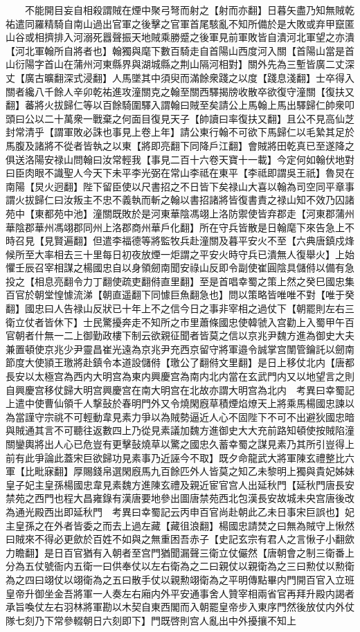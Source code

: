 　　不能開目妄自相殺謂賊在煙中聚弓弩而射之【射而亦翻】日暮矢盡乃知無賊乾祐遣同羅精騎自南山過出官軍之後擊之官軍首尾駭亂不知所備於是大敗或弃甲竄匿山谷或相擠排入河溺死囂聲振天地賊乘勝蹙之後軍見前軍敗皆自潰河北軍望之亦潰【河北軍翰所自將者也】翰獨與麾下數百騎走自首陽山西度河入關【首陽山當是首山衍陽字首山在蒲州河東縣界與湖城縣之荆山隔河相對】關外先為三塹皆廣二丈深丈【廣古曠翻深式浸翻】人馬墜其中須臾而滿餘衆踐之以度【踐息淺翻】士卒得入關者纔八千餘人辛卯乾祐進攻潼關克之翰至關西驛揭牓收散卒欲復守潼關【復扶又翻】蕃將火拔歸仁等以百餘騎圍驛入謂翰曰賊至矣請公上馬翰上馬出驛歸仁帥衆叩頭曰公以二十萬衆一戰棄之何面目復見天子【帥讀曰率復扶又翻】且公不見高仙芝封常清乎【謂軍敗必誅也事見上卷上年】請公東行翰不可欲下馬歸仁以毛縶其足於馬腹及諸將不從者皆執之以東【將即亮翻下同降戶江翻】會賊將田乾真已至遂降之俱送洛陽安禄山問翰曰汝常輕我【事見二百十六卷天寶十一載】今定何如翰伏地對曰臣肉眼不識聖人今天下未平李光弼在常山李祗在東平【李祗即謂吳王祇】魯炅在南陽【炅火迥翻】陛下留臣使以尺書招之不日皆下矣禄山大喜以翰為司空同平章事謂火拔歸仁曰汝叛主不忠不義執而斬之翰以書招諸將皆復書責之禄山知不效乃囚諸苑中【東都苑中池】潼關既敗於是河東華陰馮翊上洛防禦使皆弃郡走【河東郡蒲州華陰郡華州馮翊郡同州上洛郡商州華戶化翻】所在守兵皆散是日翰麾下來告急上不時召見【見賢遍翻】但遣李福德等將監牧兵赴潼關及暮平安火不至【六典唐鎮戍烽候所至大率相去三十里每日初夜放煙一炬謂之平安火時守兵已潰無人復舉火】上始懼壬辰召宰相謀之楊國忠自以身領劒南聞安祿山反即令副使崔圓陰具儲偫以備有急投之【相息亮翻令力丁翻使疏吏翻偫直里翻】至是首唱幸蜀之策上然之癸巳國忠集百官於朝堂惶懅流涕【朝直遥翻下同懅巨魚翻急也】問以策略皆唯唯不對【唯于癸翻】國忠曰人告禄山反狀已十年上不之信今日之事非宰相之過仗下【朝罷則左右三衛立仗者皆休下】士民驚擾奔走不知所之市里蕭條國忠使韓虢入宫勸上入蜀甲午百官朝者什無一二上御勤政樓下制云欲親征聞者皆莫之信以京兆尹魏方進為御史大夫兼置頓使京兆少尹靈昌崔光遠為京兆尹充西京留守將軍邉令誠掌宫闈管鑰託以劒南節度大使頴王璬將赴鎮令本道設儲偫【璬公了翻偫文里翻】是日上移仗北内【唐都長安以太極宫為西内大明宫為東内興慶宫為南内北内當在玄武門内又以地望言之則自興慶宫移仗歸大明宫興慶宫在南大明宫在北故亦謂大明宫為北内　考異曰幸蜀記上遣中使曹仙領千人撃鼔於春明門外又令燒閑廐草積煙焰燎天上將乘馬楊國忠諫以為當謹守宗祧不可輕動韋見素力爭以為賊勢逼近人心不固陛下不可不出避狄國忠暗與賊通其言不可聽往返數四上乃從見素議加魏方進御史大大充前路知頓使按賊陷潼關鑾輿將出人心已危豈有更擊鼔燒草以驚之國忠久蓄幸蜀之謀見素乃其所引豈得上前有此爭論此蓋宋巨欲歸功見素事乃近誣今不取】既夕命龍武大將軍陳玄禮整比六軍【比毗寐翻】厚賜錢帛選閑廐馬九百餘匹外人皆莫之知乙未黎明上獨與貴妃姊妹皇子妃主皇孫楊國忠韋見素魏方進陳玄禮及親近宦官宫人出延秋門【延秋門唐長安禁苑之西門也程大昌雍錄有漢唐要地參出圖唐禁苑西北包漢長安故城未央宫唐後改為通光殿西出即延秋門　考異曰幸蜀記云丙申百官尚赴朝此乙未日事宋巨誤也】妃主皇孫之在外者皆委之而去上過左藏【藏徂浪翻】楊國忠請焚之曰無為賊守上愀然曰賊來不得必更歛於百姓不如與之無重困吾赤子【史記玄宗有君人之言愀子小翻歛力瞻翻】是日百官猶有入朝者至宫門猶聞漏聲三衛立仗儼然【唐朝會之制三衛番上分為五仗號衙内五衛一曰供奉仗以左右衛為之二曰親仗以親衛為之三曰勲仗以勲衛為之四曰翊仗以翊衛為之五曰散手仗以親勲翊衛為之平明傳點畢内門開百官入立班皇帝升御坐金吾將軍一人奏左右廂内外平安通事舍人贊宰相兩省官再拜升殿内謁者承旨喚仗左右羽林將軍勘以木契自東西閣而入朝罷皇帝步入東序門然後放仗内外仗隊七刻乃下常參輟朝日六刻即下】門既啓則宫人亂出中外擾攘不知上